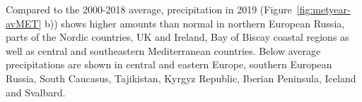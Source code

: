 Compared to the 2000-2018 average, precipitation in 2019 (Figure~\ref{fig:metyear-avMET} b)) shows higher amounts than normal in northern European Russia, parts of the Nordic countries, UK and Ireland, Bay of Biscay coastal regions as well as central and southeastern Mediterranean countries. Below average precipitations are shown in central and eastern Europe, southern European Russia, South Caucasus, Tajikistan, Kyrgyz Republic, Iberian Peninsula, Iceland and Svalbard.

\begin{figure}[h]
  \centering 

\end{figure}
